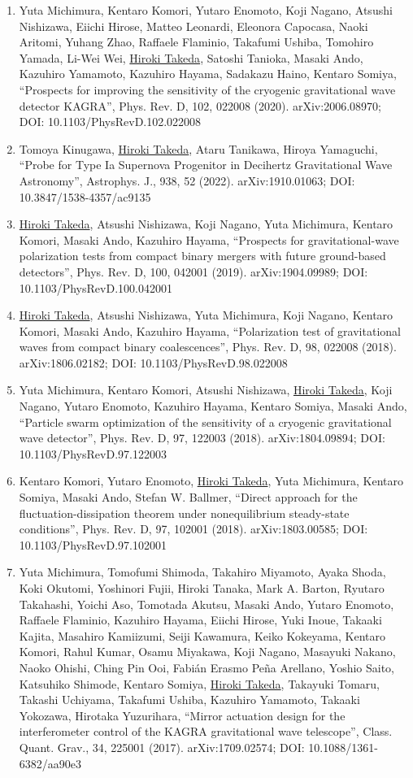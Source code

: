 \documentclass[uplatex, 12pt]{article}
\begin{document}
\begin{enumerate}
\item Yuta Michimura, Kentaro Komori, Yutaro Enomoto, Koji Nagano, Atsushi Nishizawa, Eiichi Hirose, Matteo Leonardi, Eleonora Capocasa, Naoki Aritomi, Yuhang Zhao, Raffaele Flaminio, Takafumi Ushiba, Tomohiro Yamada, Li-Wei Wei, \uline{Hiroki Takeda}, Satoshi Tanioka, Masaki Ando, Kazuhiro Yamamoto, Kazuhiro Hayama, Sadakazu Haino, Kentaro Somiya, “Prospects for improving the sensitivity of the cryogenic gravitational wave detector KAGRA”, Phys. Rev. D, 102, 022008 (2020). arXiv:2006.08970; DOI: 10.1103/PhysRevD.102.022008
\item Tomoya Kinugawa, \uline{Hiroki Takeda}, Ataru Tanikawa, Hiroya Yamaguchi, “Probe for Type Ia Supernova Progenitor in Decihertz Gravitational Wave Astronomy”, Astrophys. J., 938, 52 (2022). arXiv:1910.01063; DOI: 10.3847/1538-4357/ac9135
\item \uline{Hiroki Takeda}, Atsushi Nishizawa, Koji Nagano, Yuta Michimura, Kentaro Komori, Masaki Ando, Kazuhiro Hayama, “Prospects for gravitational-wave polarization tests from compact binary mergers with future ground-based detectors”, Phys. Rev. D, 100, 042001 (2019). arXiv:1904.09989; DOI: 10.1103/PhysRevD.100.042001
\item \uline{Hiroki Takeda}, Atsushi Nishizawa, Yuta Michimura, Koji Nagano, Kentaro Komori, Masaki Ando, Kazuhiro Hayama, “Polarization test of gravitational waves from compact binary coalescences”, Phys. Rev. D, 98, 022008 (2018). arXiv:1806.02182; DOI: 10.1103/PhysRevD.98.022008
\item Yuta Michimura, Kentaro Komori, Atsushi Nishizawa, \uline{Hiroki Takeda}, Koji Nagano, Yutaro Enomoto, Kazuhiro Hayama, Kentaro Somiya, Masaki Ando, “Particle swarm optimization of the sensitivity of a cryogenic gravitational wave detector”, Phys. Rev. D, 97, 122003 (2018). arXiv:1804.09894; DOI: 10.1103/PhysRevD.97.122003
\item Kentaro Komori, Yutaro Enomoto, \uline{Hiroki Takeda}, Yuta Michimura, Kentaro Somiya, Masaki Ando, Stefan W. Ballmer, “Direct approach for the fluctuation-dissipation theorem under nonequilibrium steady-state conditions”, Phys. Rev. D, 97, 102001 (2018). arXiv:1803.00585; DOI: 10.1103/PhysRevD.97.102001
\item Yuta Michimura, Tomofumi Shimoda, Takahiro Miyamoto, Ayaka Shoda, Koki Okutomi, Yoshinori Fujii, Hiroki Tanaka, Mark A. Barton, Ryutaro Takahashi, Yoichi Aso, Tomotada Akutsu, Masaki Ando, Yutaro Enomoto, Raffaele Flaminio, Kazuhiro Hayama, Eiichi Hirose, Yuki Inoue, Takaaki Kajita, Masahiro Kamiizumi, Seiji Kawamura, Keiko Kokeyama, Kentaro Komori, Rahul Kumar, Osamu Miyakawa, Koji Nagano, Masayuki Nakano, Naoko Ohishi, Ching Pin Ooi, Fabián Erasmo Peña Arellano, Yoshio Saito, Katsuhiko Shimode, Kentaro Somiya, \uline{Hiroki Takeda}, Takayuki Tomaru, Takashi Uchiyama, Takafumi Ushiba, Kazuhiro Yamamoto, Takaaki Yokozawa, Hirotaka Yuzurihara, “Mirror actuation design for the interferometer control of the KAGRA gravitational wave telescope”, Class. Quant. Grav., 34, 225001 (2017). arXiv:1709.02574; DOI: 10.1088/1361-6382/aa90e3
\end{enumerate}
\end{document}
